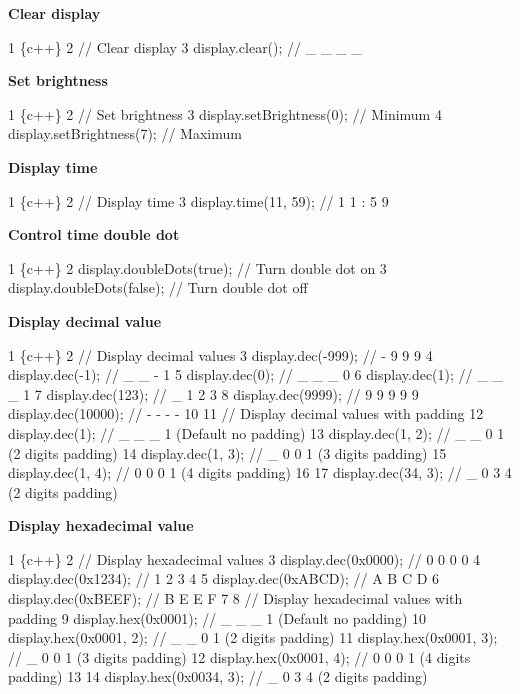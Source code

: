 {\bfseries Clear display}


\begin{DoxyCode}
1 \{c++\}
2 // Clear display
3 display.clear();    // \_ \_ \_ \_
\end{DoxyCode}


{\bfseries Set brightness}


\begin{DoxyCode}
1 \{c++\}
2 // Set brightness
3 display.setBrightness(0); // Minimum
4 display.setBrightness(7); // Maximum
\end{DoxyCode}


{\bfseries Display time}


\begin{DoxyCode}
1 \{c++\}
2 // Display time
3 display.time(11, 59);   // 1 1 : 5 9
\end{DoxyCode}


{\bfseries Control time double dot}


\begin{DoxyCode}
1 \{c++\}
2 display.doubleDots(true);   // Turn double dot on
3 display.doubleDots(false);  // Turn double dot off
\end{DoxyCode}


{\bfseries Display decimal value}


\begin{DoxyCode}
1 \{c++\}
2 // Display decimal values
3 display.dec(-999);  // - 9 9 9
4 display.dec(-1);    // \_ \_ - 1
5 display.dec(0);     // \_ \_ \_ 0
6 display.dec(1);     // \_ \_ \_ 1
7 display.dec(123);   // \_ 1 2 3
8 display.dec(9999);  // 9 9 9 9
9 display.dec(10000); // - - - -
10 
11 // Display decimal values with padding
12 display.dec(1);     // \_ \_ \_ 1  (Default no padding)
13 display.dec(1, 2);  // \_ \_ 0 1  (2 digits padding)
14 display.dec(1, 3);  // \_ 0 0 1  (3 digits padding)
15 display.dec(1, 4);  // 0 0 0 1  (4 digits padding)
16 
17 display.dec(34, 3); // \_ 0 3 4  (2 digits padding)
\end{DoxyCode}


{\bfseries Display hexadecimal value}


\begin{DoxyCode}
1 \{c++\}
2 // Display hexadecimal values
3 display.dec(0x0000);    // 0 0 0 0
4 display.dec(0x1234);    // 1 2 3 4
5 display.dec(0xABCD);    // A B C D
6 display.dec(0xBEEF);    // B E E F
7 
8 // Display hexadecimal values with padding
9 display.hex(0x0001);    // \_ \_ \_ 1  (Default no padding)
10 display.hex(0x0001, 2); // \_ \_ 0 1  (2 digits padding)
11 display.hex(0x0001, 3); // \_ 0 0 1  (3 digits padding)
12 display.hex(0x0001, 4); // 0 0 0 1  (4 digits padding)
13 
14 display.hex(0x0034, 3); // \_ 0 3 4  (2 digits padding)
\end{DoxyCode}


